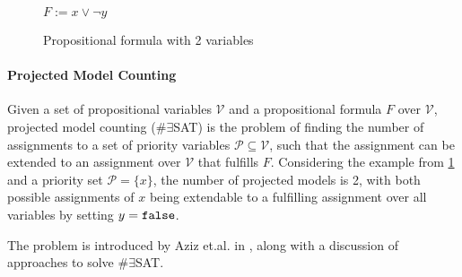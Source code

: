\begin{figure}
    \centering
    $F := x \lor \lnot y$
    \caption{Propositional formula with 2 variables}
    \label{fig:satEx}
\end{figure}



\paragraph*{Projected Model Counting}
Given a set of propositional variables $\mathcal{V}$ and a propositional formula $F$ over $\mathcal{V}$, projected model counting (\#$\exists$SAT) is the problem of finding the number of assignments to a set of priority variables $\mathcal{P} \subseteq \mathcal{V}$, such that the assignment can be extended to an assignment over $\mathcal{V}$ that fulfills $F$. Considering the example from \ref{fig:satEx} and a priority set $\mathcal{P} = \{x\}$, the number of projected models is 2, with both possible assignments of $x$ being extendable to a fulfilling assignment over all variables by setting $y = \mathtt{false}$.

The problem is introduced by Aziz et.al. in \cite{aziz15}, along with a discussion of approaches to solve \#$\exists$SAT. 


